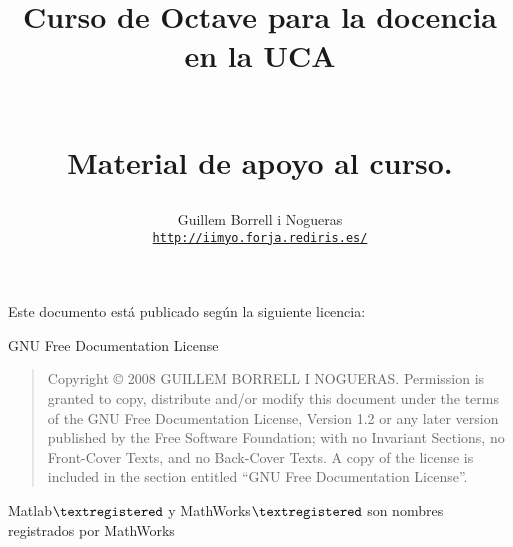 \documentclass[10pt,fleqn,a4]{book}
\begin{document}
\lstset{language=Octave}
\title{\begin{Huge}Curso de Octave para la docencia en la
    UCA\end{Huge}\\ Material de apoyo al curso.}


\author{Guillem Borrell i Nogueras\\
  \texttt{\url{http://iimyo.forja.rediris.es/}}\\
}

\maketitle


Este documento está publicado según la siguiente licencia:
\begin{center}
\begin{Huge}
GNU Free Documentation License
\end{Huge}

\end{center}

\bigskip
\begin{quote}
    Copyright \copyright{}  2008  GUILLEM BORRELL I NOGUERAS.
    Permission is granted to copy, distribute and/or modify this document
    under the terms of the GNU Free Documentation License, Version 1.2
    or any later version published by the Free Software Foundation;
    with no Invariant Sections, no Front-Cover Texts, and no Back-Cover Texts.
    A copy of the license is included in the section entitled ``GNU
    Free Documentation License''.
\end{quote}

Matlab${\textregistered}$ y MathWorks${\textregistered}$ son nombres
registrados por MathWorks\\


\tableofcontents{}

\listoffigures






\end{document}
